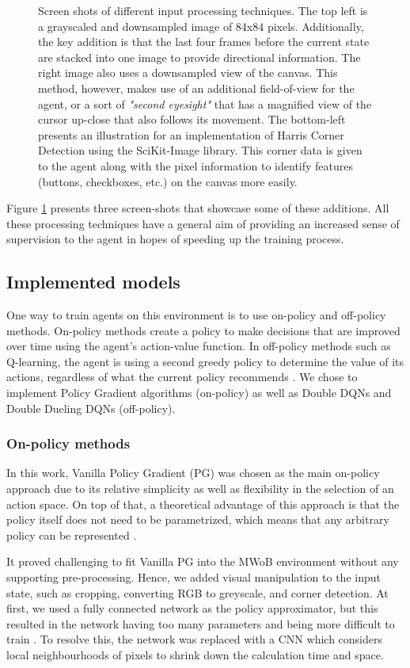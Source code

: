 \documentclass[10pt,journal,compsoc]{IEEEtran}
\begin{document}
\begin{figure}[h!]
	\caption{Screen shots of different input processing techniques. The top left is a grayscaled and downsampled image of 84x84 pixels. Additionally, the key addition is that the last four frames before the current state are stacked into one image to provide directional information. The right image also uses a downsampled view of the canvas. This method, however, makes use of an additional field-of-view for the agent, or a sort of \textit{"second eyesight"} that has a magnified view of the cursor up-close that also follows its movement. The bottom-left presents an illustration for an implementation of Harris Corner Detection using the SciKit-Image library. This corner data is given to the agent along with the pixel information to identify features (buttons, checkboxes, etc.) on the canvas more easily.}
	\label{fig:inputprocessing}
\end{figure}

Figure \ref{fig:inputprocessing} presents three screen-shots that showcase some of these additions.  All these processing techniques have a general aim of providing an increased sense of supervision to the agent in hopes of speeding up the training process.

\subsection{Implemented models}
One way to train agents on this environment is to use on-policy and off-policy methods. On-policy methods create a policy to make decisions that are improved over time using the agent's action-value function. In off-policy methods such as Q-learning, the agent is using a second greedy policy to determine the value of its actions, regardless of what the current policy recommends \cite{sutton1998reinforcement}. We chose to implement Policy Gradient algorithms (on-policy) as well as Double DQNs and Double Dueling DQNs (off-policy).
\subsubsection{On-policy methods}  
In this work, Vanilla Policy Gradient (PG) was chosen as the main on-policy approach due to its relative simplicity as well as flexibility in the selection of an action space.
On top of that, a theoretical advantage of this approach is that the policy itself does not need to be parametrized, which means that any arbitrary policy can be represented \cite{Peters:2010}.

It proved challenging to fit Vanilla PG into the MWoB environment without any supporting pre-processing. Hence, we added visual manipulation to the input state, such as cropping, converting RGB to greyscale, and corner detection. At first, we used a fully connected network as the policy approximator, but this resulted in the network having too many parameters and being more difficult to train \cite{LongSD14}. To resolve this, the network was replaced with a CNN which considers local neighbourhoods of pixels to shrink down the calculation time and space.
\end{document}
